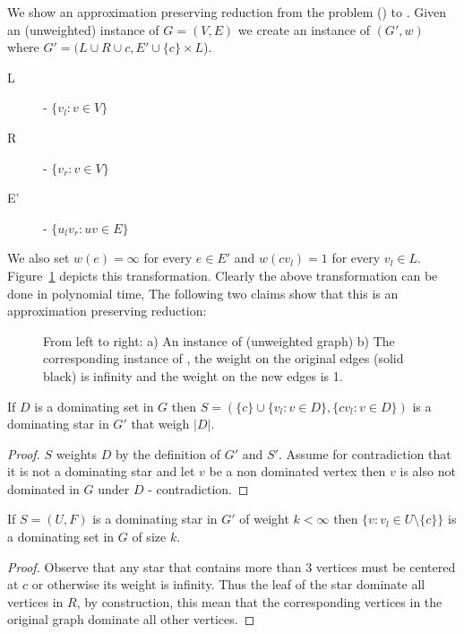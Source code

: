 We show an approximation preserving reduction from the \ProblemDom{} problem (\ProbDom)
to \ProblemStar{}.
Given an (unweighted) instance of \ProbDom{} $G = (V, E)$ we create an instance of \ProbStar{}
$(G', w)$ where $G' = (L \cup R \cup {c}, E' \cup \{c\} \times L$).
\begin{description}
\item[L] - $\{v_l : v \in V\}$
\item[R] - $\{v_r : v \in V\}$
\item[E'] - $\{u_lv_r : uv \in E\}$
\end{description}
We also set $w(e) = \infty$ for every $e \in E'$ and $w(cv_l) = 1$ for every $v_l \in L$.
Figure~\ref{fig:star-hardness} depicts this transformation.
Clearly the above transformation can be done in polynomial time,
The following two claims show that this is an approximation preserving reduction:

\begin{figure}
\begin{center}

\end{center}
\caption{\label{fig:star-hardness}
From left to right:
a) An instance of \ProbDom{} (unweighted graph)
b) The corresponding instance of \ProbStar{}, 
the weight on the original edges (solid black) is infinity 
and the weight on the new edges is 1. 
}
\end{figure} 

\begin{claim}
If $D$ is a dominating set in $G$ then 
$S = (\{c\} \cup \{v_l : v \in D\}, \{cv_l: v \in D\})$ 
is a dominating star in $G'$ that weigh $|D|$. 
\end{claim}

\begin{proof}
$S$ weights $D$ by the definition of $G'$ and $S'$.
Assume for contradiction that it is not a dominating star and let $v$ be a non dominated 
vertex then $v$ is also not dominated in $G$ under $D$ - contradiction.
\end{proof}

\begin{claim}
If $S = (U, F)$ is a dominating star in $G'$ of weight $k < \infty$ 
then $\{v : v_l \in U \setminus \{c\}\}$ is a dominating set in $G$ of size $k$.
\end{claim}

\begin{proof}
Observe that any star that contains more than 3 vertices must be centered at $c$ or otherwise
its weight is infinity.
Thus the leaf of the star dominate all vertices in $R$, by construction, this mean that the
corresponding vertices in the original graph dominate all other vertices.
\end{proof}